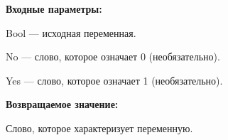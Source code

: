 \textbf{Входные параметры:}

Bool --- исходная переменная.
 
	No --- слово, которое означает 0 (необязательно).
 
    Yes --- слово, которое означает 1 (необязательно).

\textbf{Возвращаемое значение:}

Слово, которое характеризует переменную.